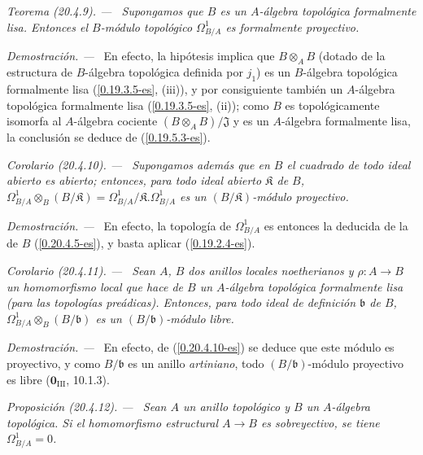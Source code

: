 \documentclass[10pt,oneside]{book}
\makeatletter
\newcommand{\sref}[1]{\textup{(\ref{#1})}}
\newcommand{\setmanualcurrentlabel}[1]{\def\@currentlabel{#1}}
\newcommand{\oldpage}[2][]{%
  \setcounter{footnote}{0}%
  \marginpar{\scriptsize\textbf{#1}~|~#2}\ignorespaces}
\newenvironment{proposition}[1][]{%
  \setmanualcurrentlabel{#1}\par\medskip\noindent\itshape Proposición (#1). ---\ }{\par}
\newenvironment{theorem}[1][]{%
  \setmanualcurrentlabel{#1}\par\medskip\noindent\itshape Teorema (#1). ---\ }{\par}
\newenvironment{corollary}[1][]{%
  \setmanualcurrentlabel{#1}\par\medskip\noindent\itshape Corolario (#1). ---\ }{\par}
\newenvironment{proof}{%
  \par\medskip\noindent\textit{Demostración. ---\ }}{\par}
\makeatother
\begin{document}
\begin{theorem}[20.4.9]
\label{0.20.4.9-es}
Supongamos que $B$ es un $A$-álgebra topológica formalmente lisa. Entonces
el $B$-módulo topológico $\Omega^1_{B/A}$ es formalmente proyectivo.
\end{theorem}

\begin{proof}
En efecto, la hipótesis implica que $B\otimes_A B$ (dotado de la estructura de
$B$-álgebra topológica definida por $j_1$) es un $B$-álgebra topológica
formalmente lisa (\ref{0.19.3.5-es}, (iii)), y por consiguiente también un
$A$-álgebra topológica formalmente lisa (\ref{0.19.3.5-es}, (ii)); como
$B$ es topológicamente isomorfa al $A$-álgebra cociente
$(B\otimes_A B)/\mathfrak{J}$ y es un $A$-álgebra formalmente lisa, la
conclusión se deduce de \sref{0.19.5.3-es}.
\end{proof}

\oldpage[0\textsubscript{IV-1}]{127}
\begin{corollary}[20.4.10]
\label{0.20.4.10-es}
Supongamos además que en $B$ el cuadrado de todo ideal abierto es abierto;
entonces, para todo ideal abierto $\mathfrak{K}$ de $B$,
$\Omega^1_{B/A}\otimes_B(B/\mathfrak{K})
=\Omega^1_{B/A}/\mathfrak{K}.\Omega^1_{B/A}$ es un
$(B/\mathfrak{K})$-módulo proyectivo.
\end{corollary}

\begin{proof}
En efecto, la topología de $\Omega^1_{B/A}$ es entonces la deducida de la de
$B$ \sref{0.20.4.5-es}, y basta aplicar \sref{0.19.2.4-es}.
\end{proof}

\begin{corollary}[20.4.11]
\label{0.20.4.11-es}
Sean $A$, $B$ dos anillos locales noetherianos y $\rho:A\to B$ un
homomorfismo local que hace de $B$ un $A$-álgebra topológica formalmente
lisa (para las topologías preádicas). Entonces, para todo ideal de definición
$\mathfrak{b}$ de $B$,
$\Omega^1_{B/A}\otimes_B(B/\mathfrak{b})$ es un
$(B/\mathfrak{b})$-módulo libre.
\end{corollary}

\begin{proof}
En efecto, de \sref{0.20.4.10-es} se deduce que este módulo es proyectivo, y
como $B/\mathfrak{b}$ es un anillo \emph{artiniano}, todo
$(B/\mathfrak{b})$-módulo proyectivo es libre
($\mathbf{0}_{\mathrm{III}}$, 10.1.3).
\end{proof}

\begin{proposition}[20.4.12]
\label{0.20.4.12-es}
Sean $A$ un anillo topológico y $B$ un $A$-álgebra topológica. Si
el homomorfismo estructural $A\to B$ es sobreyectivo, se tiene
$\Omega^1_{B/A}=0$.
\end{proposition}
\end{document}
